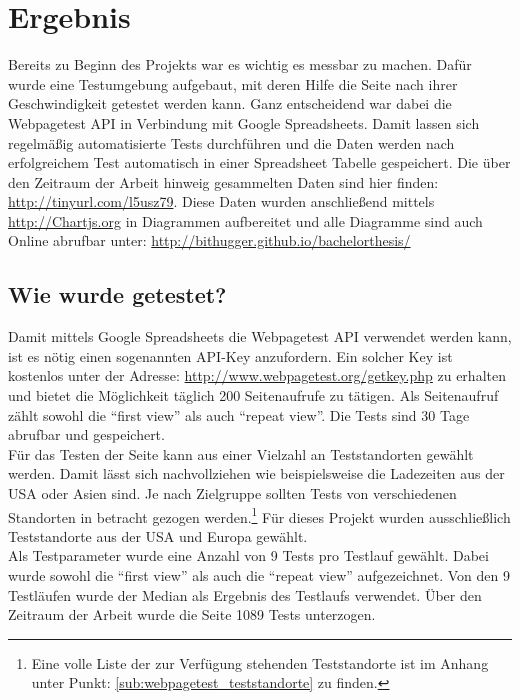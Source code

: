 \section{Ergebnis} %
\label{sec:ergebnis}
	Bereits zu Beginn des Projekts war es wichtig es messbar zu machen. Dafür wurde eine Testumgebung aufgebaut, mit deren Hilfe die Seite nach ihrer Geschwindigkeit getestet werden kann. Ganz entscheidend war dabei die Webpagetest API in Verbindung mit Google Spreadsheets. Damit lassen sich regelmäßig automatisierte Tests durchführen und die Daten werden nach erfolgreichem Test automatisch in einer Spreadsheet Tabelle gespeichert. Die über den Zeitraum der Arbeit hinweig gesammelten Daten sind hier finden: \url{http://tinyurl.com/l5usz79}. Diese Daten wurden anschließend mittels \url{http://Chartjs.org} in Diagrammen aufbereitet und alle Diagramme sind auch Online abrufbar unter: \url{http://bithugger.github.io/bachelorthesis/}

	\subsection{Wie wurde getestet?} %
	\label{sub:wie_wurde_getestet}
		Damit mittels Google Spreadsheets die Webpagetest API verwendet werden kann, ist es nötig einen sogenannten API-Key anzufordern. Ein solcher Key ist kostenlos unter der Adresse: \url{http://www.webpagetest.org/getkey.php} zu erhalten und bietet die Möglichkeit täglich 200 Seitenaufrufe zu tätigen. Als Seitenaufruf zählt sowohl die "`first view"' als auch "`repeat view"'. Die Tests sind 30 Tage abrufbar und gespeichert.\\

		Für das Testen der Seite kann aus einer Vielzahl an Teststandorten gewählt werden. Damit lässt sich nachvollziehen wie beispielsweise die Ladezeiten aus der USA oder Asien sind. Je nach Zielgruppe sollten Tests von verschiedenen Standorten in betracht gezogen werden.\footnote{Eine volle Liste der zur Verfügung stehenden Teststandorte ist im Anhang unter Punkt: \ref{sub:webpagetest_teststandorte} zu finden.} Für dieses Projekt wurden ausschließlich Teststandorte aus der USA und Europa gewählt.\\

		Als Testparameter wurde eine Anzahl von 9 Tests pro Testlauf gewählt. Dabei wurde sowohl die "`first view"' als auch die "`repeat view"' aufgezeichnet. Von den 9 Testläufen wurde der Median als Ergebnis des Testlaufs verwendet. Über den Zeitraum der Arbeit wurde die Seite 1089 Tests unterzogen.\\

